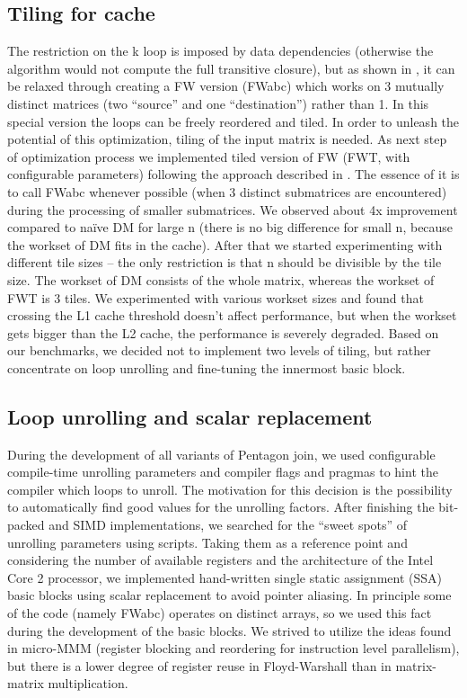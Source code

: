 \documentclass[letterpaper]{article}
\begin{document}
\subsection{Tiling for cache}
The restriction on the k loop is imposed by data dependencies 
(otherwise the algorithm would not compute the full transitive closure), 
but as shown in \cite{Pueschel2006}, it can be relaxed through creating 
a FW version (FWabc) which works on 3 mutually distinct matrices (two “source” and one “destination”) 
rather than 1. In this special version the loops can be freely reordered 
and tiled. In order to unleash the potential of this optimization, tiling 
of the input matrix is needed. As next step of optimization process we 
implemented tiled version of FW (FWT, with configurable parameters) following 
the approach described in \cite{Pueschel2006}. The 
essence of it is to call FWabc whenever possible (when 3 distinct submatrices are encountered) 
during the processing of smaller submatrices. We observed about 4x improvement 
compared to naïve DM for large n (there is no big difference for small n, because 
the workset of DM fits in the cache). After that we started experimenting with 
different tile sizes – the only restriction is that n should be divisible by the 
tile size. The workset of DM consists of the whole matrix, whereas the workset 
of FWT is 3 tiles. We experimented with various workset sizes and found that 
crossing the L1 cache threshold doesn't affect performance, but when the workset 
gets bigger than the L2 cache, the performance is severely degraded. Based on our 
benchmarks, we decided not to implement two levels of tiling, but rather 
concentrate on loop unrolling and fine-tuning the innermost basic block.

\subsection{Loop unrolling and scalar replacement}
During the development of all variants of Pentagon join, we used configurable 
compile-time unrolling parameters and compiler flags and pragmas to hint 
the compiler which loops to unroll. The motivation for this decision is 
the possibility to automatically find good values for the unrolling factors. 
After finishing the bit-packed and SIMD implementations, we searched for 
the ``sweet spots'' of unrolling parameters using scripts. Taking them as a 
reference point and considering the number of available registers and the architecture of the Intel Core 2 processor, 
we implemented hand-written single static assignment (SSA) basic blocks using 
scalar replacement to avoid pointer aliasing. In principle some of the code (namely FWabc) 
operates on distinct arrays, so we used this fact during the development of the basic blocks. 
We strived to utilize the ideas found in micro-MMM (register blocking and reordering 
for instruction level parallelism), but there is a lower degree of register reuse in Floyd-Warshall than in matrix-matrix multiplication.
\end{document}
